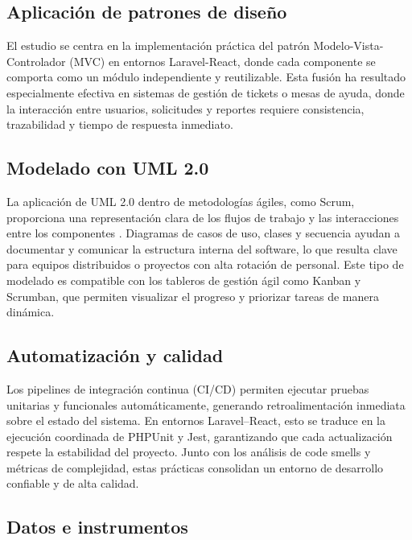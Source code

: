 \subsection{Aplicación de patrones de diseño}

El estudio se centra en la implementación práctica del patrón Modelo-Vista-Controlador (MVC) \cite{mvc2019analysis} en entornos Laravel-React, donde cada componente se comporta como un módulo independiente y reutilizable. Esta fusión ha resultado especialmente efectiva en sistemas de gestión de tickets o mesas de ayuda, donde la interacción entre usuarios, solicitudes y reportes requiere consistencia, trazabilidad y tiempo de respuesta inmediato.

\subsection{Modelado con UML 2.0}

La aplicación de UML 2.0 \cite{uml2020guide} dentro de metodologías ágiles, como Scrum, proporciona una representación clara de los flujos de trabajo y las interacciones entre los componentes \cite{uml2021agile}. Diagramas de casos de uso, clases y secuencia ayudan a documentar y comunicar la estructura interna del software, lo que resulta clave para equipos distribuidos o proyectos con alta rotación de personal. Este tipo de modelado es compatible con los tableros de gestión ágil como Kanban y Scrumban, que permiten visualizar el progreso y priorizar tareas de manera dinámica.

\subsection{Automatización y calidad}

Los pipelines de integración continua (CI/CD) \cite{fowler2006continuous} permiten ejecutar pruebas unitarias \cite{phpunit2022testing} y funcionales \cite{jest2021frontend} automáticamente, generando retroalimentación inmediata sobre el estado del sistema. En entornos Laravel–React, esto se traduce en la ejecución coordinada de PHPUnit y Jest, garantizando que cada actualización respete la estabilidad del proyecto. Junto con los análisis de code smells \cite{code2022smells} y métricas de complejidad, estas prácticas consolidan un entorno de desarrollo confiable y de alta calidad.

\subsection{Datos e instrumentos}

